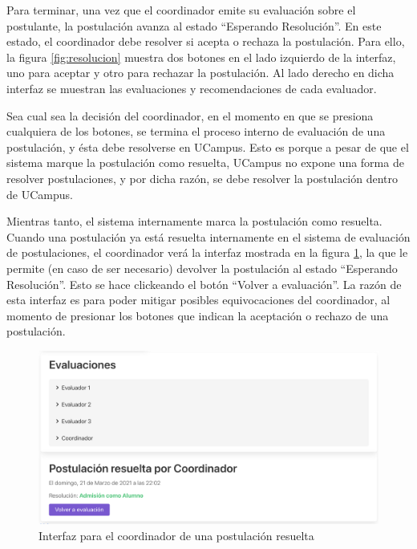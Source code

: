 Para terminar, una vez que el coordinador emite su evaluación sobre el
postulante, la postulación avanza al estado “Esperando Resolución”. En este
estado, el coordinador debe resolver si acepta o rechaza la postulación. Para
ello, la figura \ref{fig:resolucion} muestra dos botones en el lado izquierdo de
la interfaz, uno para aceptar y otro para rechazar la postulación. Al lado
derecho en dicha interfaz se muestran las evaluaciones y recomendaciones de cada
evaluador.

Sea cual sea la decisión del coordinador, en el momento en que se presiona
cualquiera de los botones, se termina el proceso interno de evaluación de una
postulación, y ésta debe resolverse en UCampus. Esto es porque a pesar de que el
sistema marque la postulación como resuelta, UCampus no expone una forma de
resolver postulaciones, y por dicha razón, se debe resolver la postulación
dentro de UCampus.

Mientras tanto, el sistema internamente marca la postulación como resuelta.
Cuando una postulación ya está resuelta internamente en el sistema de evaluación
de postulaciones, el coordinador verá la interfaz mostrada en la figura
\ref{fig:postulacion-resuelta}, la que le permite (en caso de ser necesario)
devolver la postulación al estado “Esperando Resolución”. Esto se hace
clickeando el botón “Volver a evaluación”. La razón de esta interfaz es para
poder mitigar posibles equivocaciones del coordinador, al momento de presionar
los botones que indican la aceptación o rechazo de una postulación.

\begin{figure}[!ht]
    \begin{center}
        \includegraphics[scale=0.44]{imagenes/04-postulacion-resuelta.png}
    \end{center}
    \caption{Interfaz para el coordinador de una postulación resuelta}
    \label{fig:postulacion-resuelta}
\end{figure}